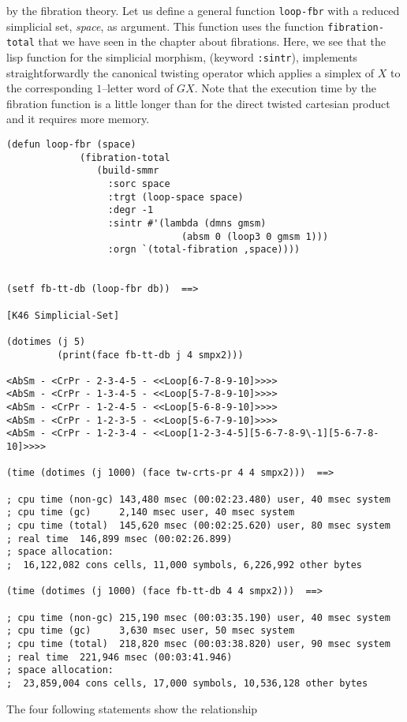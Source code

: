 by the fibration theory. 
Let us define a general function {\tt loop-fbr} with  a reduced simplicial set,
{\em space}, as argument. This function uses the function {\tt fibration-total} 
that we have seen in the  chapter about fibrations.
Here, we see that the lisp function for the simplicial morphism, (keyword {\tt :sintr}),
implements straightforwardly the canonical twisting operator which applies a simplex of $X$ 
to the corresponding $1$--letter word of $GX$. Note that the execution time by 
the fibration function is a little longer than for the direct twisted cartesian product 
and it requires more memory.
{\footnotesize\begin{verbatim}
(defun loop-fbr (space)
             (fibration-total
                (build-smmr
                  :sorc space 
                  :trgt (loop-space space) 
                  :degr -1
                  :sintr #'(lambda (dmns gmsm)
                               (absm 0 (loop3 0 gmsm 1)))
                  :orgn `(total-fibration ,space))))


(setf fb-tt-db (loop-fbr db))  ==>

[K46 Simplicial-Set]

(dotimes (j 5)
         (print(face fb-tt-db j 4 smpx2)))

<AbSm - <CrPr - 2-3-4-5 - <<Loop[6-7-8-9-10]>>>> 
<AbSm - <CrPr - 1-3-4-5 - <<Loop[5-7-8-9-10]>>>> 
<AbSm - <CrPr - 1-2-4-5 - <<Loop[5-6-8-9-10]>>>> 
<AbSm - <CrPr - 1-2-3-5 - <<Loop[5-6-7-9-10]>>>> 
<AbSm - <CrPr - 1-2-3-4 - <<Loop[1-2-3-4-5][5-6-7-8-9\-1][5-6-7-8-10]>>>> 

(time (dotimes (j 1000) (face tw-crts-pr 4 4 smpx2)))  ==>

; cpu time (non-gc) 143,480 msec (00:02:23.480) user, 40 msec system
; cpu time (gc)     2,140 msec user, 40 msec system
; cpu time (total)  145,620 msec (00:02:25.620) user, 80 msec system
; real time  146,899 msec (00:02:26.899)
; space allocation:
;  16,122,082 cons cells, 11,000 symbols, 6,226,992 other bytes

(time (dotimes (j 1000) (face fb-tt-db 4 4 smpx2)))  ==>

; cpu time (non-gc) 215,190 msec (00:03:35.190) user, 40 msec system
; cpu time (gc)     3,630 msec user, 50 msec system
; cpu time (total)  218,820 msec (00:03:38.820) user, 90 msec system
; real time  221,946 msec (00:03:41.946)
; space allocation:
;  23,859,004 cons cells, 17,000 symbols, 10,536,128 other bytes
\end{verbatim}}
The four following statements show the relationship
